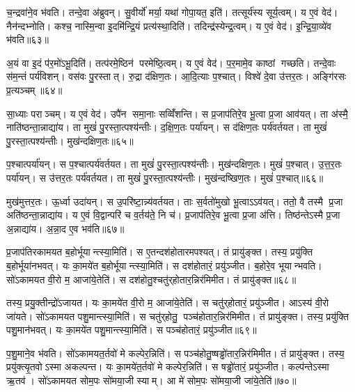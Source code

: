 च॒न्द्रवा॑ने॒व भ॑वति। तन्दे॒वा अ॑ब्रुवन्। सु॒वीर्यो॑ मर्या॒ यथा॑ गोपा॒यत॒ इति॑। तत्सूर्य॑स्य सूर्य॒त्वम्। य ए॒वं वेद॑। नैन॑न्दभ्नोति। कश्च॒ नास्मि॒न्वा इ॒दमि॑न्द्रि॒यं प्रत्य॑स्था॒दिति॑। तदिन्द्र॑स्येन्द्र॒त्वम्। य ए॒वं वेद॑। इ॒न्द्रि॒या॒व्ये॑व भ॑वति॥६३॥

अ॒यं वा इ॒दं प॑र॒मो॑ऽभू॒दिति॑। तत्प॑रमे॒ष्ठिन॑ परमेष्ठि॒त्वम्। य ए॒वं वेद॑। प॒र॒मामे॒व काष्ठां गच्छति। तन्दे॒वाः स॑म॒न्तं पर्य॑विशन्। वस॑वः पु॒रस्तात्। रु॒द्रा द॑क्षिण॒तः। आ॒दि॒त्याः प॒श्चात्। विश्वे॑ दे॒वा उ॑त्तर॒तः। अङ्गि॑रसः प्र॒त्यञ्चम्॥६४॥

सा॒ध्याः पराञ्चम्। य ए॒वं वेद॑। उपै॑न समा॒नाः सव्विँ॑शन्ति। स प्र॒जाप॑तिरे॒व भू॒त्वा प्र॒जा आव॑यत्। ता अ॑स्मै॒ नाति॑ष्ठन्ता॒न्नाद्या॑य। ता मुखं॑ पु॒रस्ता॒त्पश्य॑न्तीः। द॒क्षि॒ण॒तः पर्या॑यन्। स द॑क्षिण॒तः पर्य॑वर्तयत। ता मुखं॑ पु॒रस्ता॒त्पश्य॑न्तीः। मुख॑न्दक्षिण॒तः॥६५॥

प॒श्चात्पर्या॑यन्। स प॒श्चात्पर्य॑वर्तयत। ता मुखं॑ पु॒रस्ता॒त्पश्य॑न्तीः। मुख॑न्दक्षिण॒तः। मुखं॑ प॒श्चात्। उ॒त्त॒र॒तः पर्या॑यन्। स उ॑त्तर॒तः पर्य॑वर्तयत। ता मुखं॑ पु॒रस्ता॒त्पश्य॑न्तीः। मुख॑न्दष्खिण॒तः। मुखं॑ प॒श्चात्॥६६॥

मुख॑मुत्तर॒तः। ऊ॒र्ध्वा उदा॑यन्। स उ॒परि॑ष्टा॒न्न्य॑वर्तयत। ताः स॒र्वतो॑मुखो भू॒त्वाऽऽव॑यत्। ततो॒ वै तस्मै प्र॒जा अति॑ष्ठन्ता॒न्नाद्या॑य। य ए॒वं वि॒द्वान्परि॑ च व॒र्तय॑ते॒ नि च॑। प्र॒जाप॑तिरे॒व भू॒त्वा प्र॒जा अ॑त्ति। तिष्ठ॑न्तेऽस्मै प्र॒जा अ॒न्नाद्या॑य। अ॒न्ना॒द ए॒व भव॑ति॥६७॥\anuvakamend[आ॒सी॒द्वेद॑ चन्द्रम॒स्त्वय्यँ ए॒वं वेदेन्द्रिया॒व्ये॑व भ॑वति प्र॒त्यञ्चं॒ मुख॑न्दक्षिण॒तो मुखं॑ प॒श्चान्नव॑ च]

प्र॒जाप॑तिरकामयत ब॒होर्भूयान्त्स्या॒मिति॑। स ए॒तन्दश॑होतारमपश्यत्। तं प्रायु॑ङ्क्त। तस्य॒ प्रयु॑क्ति ब॒होर्भूया॑नभवत्। यः का॒मये॑त ब॒होर्भूयान्त्स्या॒मिति॑। स दश॑होतारं॒ प्रयु॑ञ्जीत। ब॒होरे॒व भूयान्भवति। सो॑ऽकामयत वी॒रो म॒ आजा॑ये॒तेति॑। स दश॑होतु॒श्चतु॑र्‌होतार॒न्निर॑मिमीत। तं प्रायु॑ङ्क्त॥६८॥

तस्य॒ प्रयु॒क्तीन्द्रो॑ऽजायत। यः का॒मये॑त वी॒रो म॒ आजा॑ये॒तेति॑। स चतु॑र्‌होतारं॒ प्रयु॑ञ्जीत। आऽस्य॑ वी॒रो जा॑यते। सो॑ऽकामयत पशु॒मान्त्स्या॒मिति॑। स चतु॑र्‌होतु॒ पञ्च॑होतार॒न्निर॑मिमीत। तं प्रायु॑ङ्क्त। तस्य॒ प्रयु॑क्ति पशु॒मान॑भवत्। यः का॒मये॑त पशु॒मान्त्स्या॒मिति॑। स पञ्च॑होतारं॒ प्रयु॑ञ्जीत॥६९॥

प॒शु॒माने॒व भ॑वति। सो॑ऽकामयत॒र्तवो॑ मे कल्पेर॒न्निति॑। स पञ्च॑होतु॒ष्षड्ढो॑तार॒न्निर॑मिमीत। तं प्रायु॑ङ्क्त। तस्य॒ प्रयु॑क्त्यृ॒तवोऽस्मा अकल्पन्त। यः का॒मये॑त॒र्तवो॑ मे कल्पेर॒न्निति॑। स षड्ढो॑तारं॒ प्रयु॑ञ्जीत। कल्प॑न्तेऽस्मा ऋ॒तव॑। सो॑ऽकामयत सोम॒पः सो॑मया॒जी स्याम्। आ मे॑ सोम॒पः सो॑मया॒जी जा॑ये॒तेति॑॥७०॥

